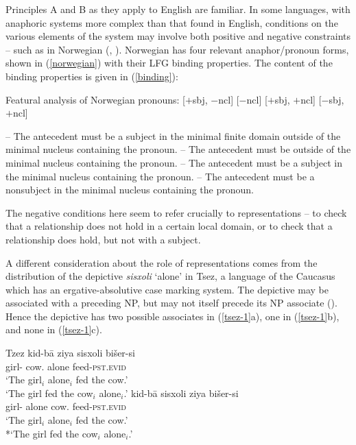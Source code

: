 \documentclass[output=paper,hidelinks]{langscibook}
\begin{document}
Principles A and B as they apply to English are familiar. In some
languages, with anaphoric systems more complex than that found in
English, conditions on the various elements of the system may involve
both positive and negative constraints -- such as in Norwegian
(\citealp[279--288]{dalrymple01},
\citealp[259--261]{BresnanEtAl2016}). Norwegian has four relevant
anaphor/pronoun forms, shown in (\ref{norwegian}) with their LFG
binding properties. The content of the binding properties is given in
(\ref{binding}):

\ea\label{norwegian}Featural analysis of Norwegian pronouns:
\ea
{}[$+$sbj, $-$ncl]
\ex
{}[$-$ncl]
\ex
{}[$+$sbj, $+$ncl]
\ex
{}[$-$sbj, $+$ncl]
\z\z

\ea\label{binding}\ea{} – The antecedent must be a subject in the minimal
finite domain outside of the minimal nucleus containing the pronoun.
\ex\relax
[$-$ncl] – The antecedent must be outside of the minimal
nucleus containing the pronoun. 
\ex{} – The antecedent must be a subject in the minimal
nucleus containing the pronoun. 
\ex{} – The antecedent must be a nonsubject in the minimal
nucleus containing the pronoun.
\z\z

The negative conditions here seem to refer crucially to
representations -- to check that a relationship does not hold in a
certain local domain, or to check that a relationship does hold, but
not with a subject.

A different consideration about the role of representations comes from
the distribution of the depictive \textit{sisxoli} `alone' in Tsez, a
language of the Caucasus which has an ergative-absolutive case
marking system. The depictive may be associated with a preceding NP,
but may not itself precede its NP associate
(\citealp{polinsky00}). Hence the depictive has two possible
associates in (\ref{tsez-1}a), one in (\ref{tsez-1}b), and none in (\ref{tsez-1}c).

\ea\label{tsez-1} Tzez
\ea
\gll kid-b\={a}  ziya sisxoli bi\v{s}er-si\\
girl-{\ERG} cow.{\ABS} alone feed-\textsc{pst.evid}\\
\glt `The girl$_i$ alone$_i$ fed the cow.'\\
`The girl fed the cow$_i$ alone$_i$.'
\ex
\gll kid-b\={a} sisxoli ziya bi\v{s}er-si\\
girl-{\ERG} alone cow.{\ABS} feed-\textsc{pst.evid}\\
\glt `The girl$_i$ alone$_i$ fed the cow.'\\
{*}`The girl fed the cow$_i$ alone$_i$.'
\z \z
\end{document}
